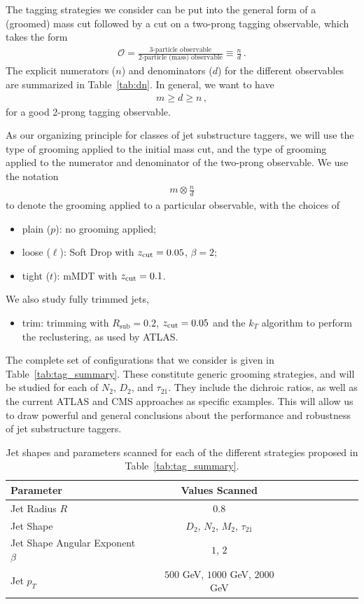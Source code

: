 \documentclass[11pt,letterpaper]{article}
\DeclareRobustCommand{\Tab}[1]{Table~\ref{#1}}
\newcommand{\zcut}{z_{\rm cut}}
\begin{document}
The tagging strategies we consider can be put into the general form of a (groomed) mass cut followed by a cut on a two-prong tagging observable, which takes the form
%
\begin{align}
\mathcal{O}=\frac{\text{3-particle observable}}{\text{2-particle (mass) observable}} \equiv \frac{n}{d}\,.
\end{align}
%
The explicit numerators ($n$) and denominators ($d$) for the different observables are summarized in \Tab{tab:dn}.
%
In general, we want to have
\begin{align}
m \geq d \geq n\,,
\end{align}
for a good 2-prong tagging observable.
%

As our organizing principle for classes of  jet substructure taggers, we will use the type of grooming applied to the initial mass cut, and the type of grooming applied to the numerator and denominator of the two-prong observable.
%
We use the notation 
\begin{align}
m \otimes \frac{n}{d}
\end{align}
to denote the grooming applied to a particular observable, with the choices of
%
\begin{itemize}
\item plain ($p$): no grooming applied;
\item loose ($\ell$): Soft Drop with $\zcut=0.05$, $\beta=2$;
\item tight ($t$): mMDT with $\zcut=0.1$.
\end{itemize}
%
We also study fully trimmed jets,
\begin{itemize}
\item trim: trimming with $R_{\text{sub}}=0.2$,  $ \zcut=0.05$ and the $k_T$ algorithm to perform the reclustering, as used by ATLAS.
\end{itemize}
%
The complete set of configurations that we consider is given in \Tab{tab:tag_summary}.
%
These constitute generic grooming strategies, and will be studied for each of $N_2$, $D_2$, and $\tau_{21}$.
%
They include the dichroic ratios, as well as the current ATLAS and CMS approaches as specific examples.
%
This will allow us to draw powerful and general conclusions about the performance and robustness of jet substructure taggers.


\begin{table}
\begin{center}
\begin{tabular}{| l | c | c |c |c|c|c |c|r| }
  \hline                       
  Parameter &  Values Scanned \\
  \hline
  Jet Radius $R$ &   $0.8$ \\
  Jet Shape  &   $D_2$, $N_2$, $M_2$, $\tau_{21}$  \\
  Jet Shape Angular Exponent $\beta$ &   $1$, $2$ \\
  Jet $p_T$ &   $500$ GeV, $1000$ GeV, $2000$ GeV  \\
  \hline  
\end{tabular}
\end{center}
\caption{
Jet shapes and parameters scanned for each of the different strategies proposed in \Tab{tab:tag_summary}. 
}
\label{tab:params}
\end{table}
\end{document}
